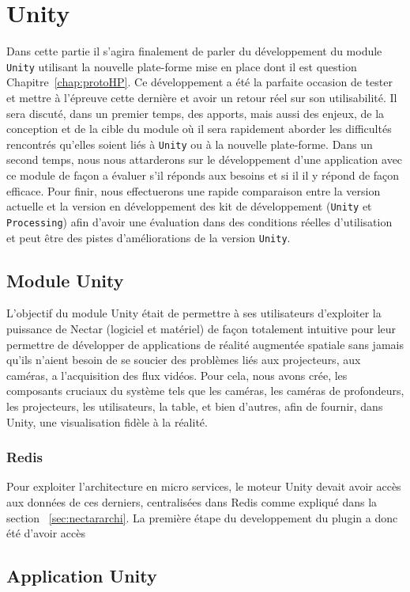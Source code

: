 \chapter{Unity}

Dans cette partie il s'agira finalement de parler du développement du module \texttt{Unity} utilisant la nouvelle plate-forme mise en place dont il est question Chapitre~\ref{chap:protoHP}. Ce développement a été la parfaite occasion de tester et mettre à l'épreuve cette dernière et avoir un retour réel sur son utilisabilité.
Il sera discuté, dans un premier temps, des apports, mais aussi des enjeux, de la conception et de la cible du module où il sera rapidement aborder les difficultés rencontrés qu'elles soient liés à \texttt{Unity} ou à la nouvelle plate-forme. 
Dans un second temps, nous nous attarderons sur le développement d'une application avec ce module de façon a évaluer s'il réponds aux besoins et si il il y répond de façon efficace.
Pour finir, nous effectuerons une rapide comparaison entre la version actuelle et la version en développement des kit de développement (\texttt{Unity} et \texttt{Processing}) afin d'avoir une évaluation dans des conditions réelles d'utilisation et peut être des pistes d'améliorations de la version \texttt{Unity}.

\section{Module Unity}

L'objectif du module Unity était de permettre à ses utilisateurs d'exploiter la puissance de Nectar (logiciel et matériel) de façon totalement intuitive pour leur permettre de développer de applications de réalité augmentée spatiale sans jamais qu'ils n'aient besoin de se soucier des problèmes liés aux projecteurs, aux caméras, a l'acquisition des flux vidéos.
Pour cela, nous avons crée, les composants cruciaux du système tels que les caméras, les caméras de profondeurs, les projecteurs, les utilisateurs, la table, et bien d'autres, afin de fournir, dans Unity, une visualisation fidèle à la réalité.

\subsection{Redis}
Pour exploiter l'architecture en micro services, le moteur Unity devait avoir accès aux données de ces derniers, centralisées dans Redis comme expliqué dans la section ~\ref{sec:nectararchi}.
La première étape du developpement du plugin a donc été d'avoir accès

\section{Application Unity}
